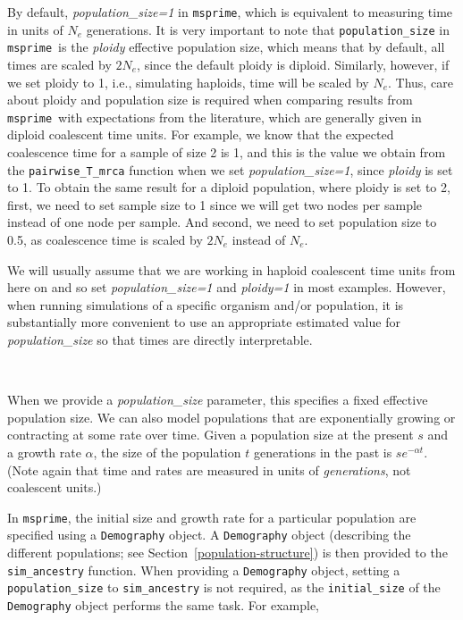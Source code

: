 \documentclass[graybox]{svmult}
\newcommand{\msprime}[0]{\texttt{msprime}}
\begin{document}
By default, \emph{population\_size=1} in \msprime, which is equivalent to measuring
time in units of \(N_e\) generations. It is very important to note that
\texttt{population\_size} in \msprime\ is the \emph{ploidy} effective population size,
which means that by default, all times are scaled by \(2N_e\), since the default ploidy is diploid. Similarly, however,
if we set ploidy to 1, i.e., simulating haploids, time will be scaled by $N_e$. Thus, care about ploidy
and population size is required when comparing results from \msprime\ with expectations from the literature, which
are generally given in diploid coalescent time units. For example, we know that the expected
coalescence time for a sample of size 2 is 1, and this is the value we
obtain from the \texttt{pairwise\_T\_mrca} function when we set \emph{population\_size=1}, since \emph{ploidy}
is set to 1. To obtain the same result for a diploid population, where ploidy is set to 2, first, we need to set
sample size to 1 since we will get two nodes per sample instead of one node per sample. And second, we need to set population
size to 0.5, as coalescence time is scaled by \(2N_e\) instead of \(N_e\).

We will usually assume that we are working in haploid
coalescent time units from here on and so set \emph{population\_size=1} and \emph{ploidy=1} in most
examples. However, when running simulations of a specific organism and/or population, it
is substantially more convenient to use an appropriate estimated value
for \emph{population\_size} so that times are directly interpretable.

\label{exponentially-growingshrinking-populations} \

When we provide a \emph{population\_size} parameter, this specifies a fixed effective
population size. We can also model populations that are exponentially
growing or contracting at some rate over time. Given a population size
at the present \(s\) and a growth rate \(\alpha\), the size of the
population \(t\) generations in the past is $s e^{-\alpha t}$. (Note
again that time and rates are measured in units of \emph{generations},
not coalescent units.)

In \msprime, the initial size and growth rate for a particular population
are specified using a \texttt{Demography} object. A \texttt{Demography} object
(describing the different populations; see Section~\ref{population-structure})
is then provided to the \texttt{sim\_ancestry} function. When providing a
\texttt{Demography} object, setting a \texttt{population\_size} to
\texttt{sim\_ancestry} is not required, as the \texttt{initial\_size} of the
\texttt{Demography} object performs the same task. For example,
\end{document}
